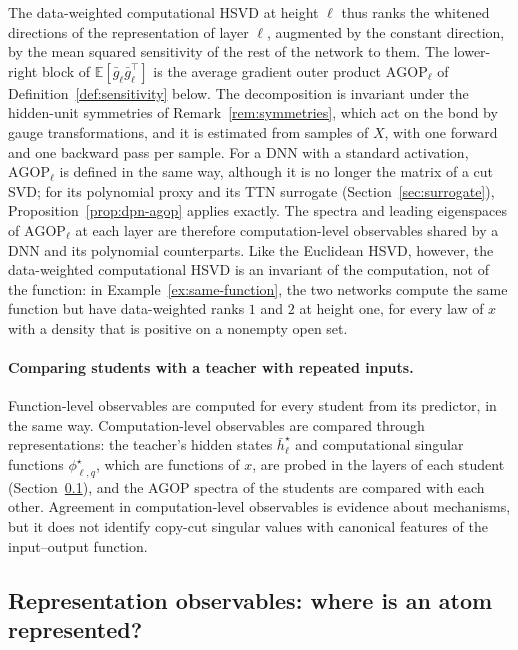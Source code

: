 \documentclass[11pt]{article}
\newcommand{\E}{\mathbb{E}}
\newcommand{\hb}{\bar{h}}
\theoremstyle{definition}
\numberwithin{equation}{section}
\begin{document}
The data-weighted computational HSVD at height $\ell$ thus ranks the whitened directions of the representation of layer $\ell$, augmented by the constant direction, by the mean squared sensitivity of the rest of the network to them. The lower-right block of $\E[\bar g_\ell\bar g_\ell^\top]$ is the average gradient outer product $\mathrm{AGOP}_\ell$ of Definition~\ref{def:sensitivity} below. The decomposition is invariant under the hidden-unit symmetries of Remark~\ref{rem:symmetries}, which act on the bond by gauge transformations, and it is estimated from samples of $X$, with one forward and one backward pass per sample. For a DNN with a standard activation, $\mathrm{AGOP}_\ell$ is defined in the same way, although it is no longer the matrix of a cut SVD; for its polynomial proxy and its TTN surrogate (Section~\ref{sec:surrogate}), Proposition~\ref{prop:dpn-agop} applies exactly. The spectra and leading eigenspaces of $\mathrm{AGOP}_\ell$ at each layer are therefore computation-level observables shared by a DNN and its polynomial counterparts. Like the Euclidean HSVD, however, the data-weighted computational HSVD is an invariant of the computation, not of the function: in Example~\ref{ex:same-function}, the two networks compute the same function but have data-weighted ranks $1$ and $2$ at height one, for every law of $x$ with a density that is positive on a nonempty open set.

\paragraph{Comparing students with a teacher with repeated inputs.}
Function-level observables are computed for every student from its predictor, in the same way. Computation-level observables are compared through representations: the teacher's hidden states $\hb^\star_\ell$ and computational singular functions $\phi^\star_{\ell,q}$, which are functions of $x$, are probed in the layers of each student (Section~\ref{sec:representation}), and the AGOP spectra of the students are compared with each other. Agreement in computation-level observables is evidence about mechanisms, but it does not identify copy-cut singular values with canonical features of the input--output function.

\subsection{Representation observables: where is an atom represented?}\label{sec:representation}
\end{document}
